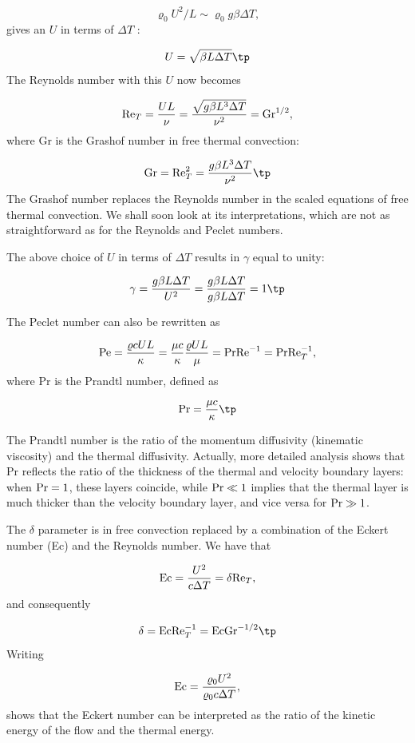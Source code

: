 \documentclass[graybox,envcountchap,sectrefs,final]{svmonodo}
\begin{document}
\[ \varrho_0 U^2/L \sim \varrho_0 g \beta\Delta T,\]
gives an $U$ in terms of $\Delta T$ :

\[ U = \sqrt{\beta L \Delta T}\tp\]
The Reynolds number with this $U$ now becomes

\[ \hbox{Re}_T = \frac{UL}{\nu} = \frac{\sqrt{g\beta L^3 \Delta T}}{\nu^2}
= \hbox{Gr}^{1/2},\]
where Gr is the Grashof number in free thermal convection:

\[ \hbox{Gr} = \hbox{Re}_T^2 =  \frac{g\beta L^3 \Delta T}{\nu^2}\tp\]
The Grashof number replaces the Reynolds number in the scaled equations
of free thermal convection. We shall soon look at its interpretations,
which are not as straightforward as for the Reynolds and Peclet numbers.

The above
choice of $U$ in terms of $\Delta T$ results in $\gamma$ equal to unity:

\[ \gamma = \frac{g\beta L\Delta T }{U^2} =
\frac{g\beta L\Delta T }{g\beta L \Delta T} = 1\tp\]


The Peclet number can also be rewritten as

\[ \hbox{Pe}= \frac{\varrho c UL}{\kappa } = \frac{\mu c}{\kappa}
\frac{\varrho UL}{\mu}
= \hbox{Pr}\hbox{Re}^{-1} = \hbox{Pr}\hbox{Re}_T^{-1},\]
where Pr is the Prandtl number, defined as

\[ \hbox{Pr} = \frac{\mu c}{\kappa}\tp\]

The Prandtl number is the ratio of the momentum diffusivity (kinematic
viscosity) and the thermal diffusivity. Actually, more detailed
analysis shows that Pr reflects the ratio of the thickness of the
thermal and velocity boundary layers: when $\hbox{Pr}=1$, these layers
coincide, while $\hbox{Pr}\ll 1$ implies that the thermal layer is
much thicker than the velocity boundary layer, and vice versa for
$\hbox{Pr}\gg 1$.


The $\delta$ parameter is in free convection replaced by a combination
of the Eckert number (Ec) and the Reynolds number. We have that

\[ \hbox{Ec} = \frac{U^2}{c\Delta T} = \delta\hbox{Re}_T,\]
and consequently

\[ \delta = \hbox{Ec}\hbox{Re}_T^{-1} = \hbox{Ec}\hbox{Gr}^{-1/2}\tp\]
Writing

\[ \hbox{Ec} = \frac{\varrho_0U^2}{\varrho_0c\Delta T},\]
shows that the Eckert number can be interpreted as the ratio of
the kinetic energy of the flow and the thermal energy.
\end{document}
